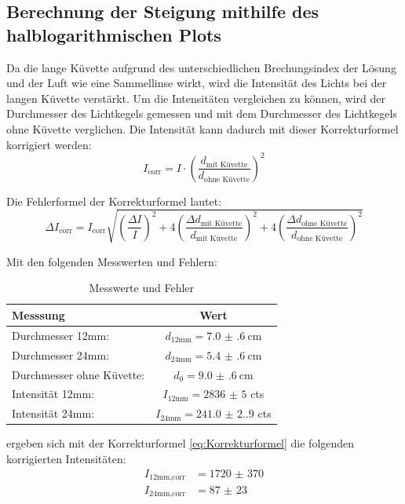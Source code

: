 \documentclass[12pt,a4paper,titlepage]{scrartcl}
\numberwithin{equation}{section}
\numberwithin{table}{section}
\numberwithin{figure}{section}
\begin{document}
\subsection{Berechnung der Steigung mithilfe des halblogarithmischen Plots}
Da die lange Küvette aufgrund des unterschiedlichen Brechungsindex der Lösung und der Luft wie eine Sammellinse wirkt, wird die Intensität des Lichts bei der langen Küvette verstärkt. Um die Intensitäten vergleichen zu können, wird der Durchmesser des Lichtkegels gemessen und mit dem Durchmesser des Lichtkegels ohne Küvette verglichen. Die Intensität kann dadurch mit dieser Korrekturformel korrigiert werden:
\begin{equation}
    I_\text{corr} = I \cdot \left(\frac{d_\text{mit Küvette}}{d_\text{ohne Küvette}}\right)^2\label{eq:Korrekturformel}
\end{equation}

Die Fehlerformel der Korrekturformel lautet:
\begin{equation}
    \Delta I_\text{corr} = I_\text{corr} \sqrt{\left(\frac{\Delta I}{I}\right)^2 + 4\left(\frac{\Delta d_\text{mit Küvette}}{d_\text{mit Küvette}}\right)^2 + 4\left(\frac{\Delta d_\text{ohne Küvette}}{d_\text{ohne Küvette}}\right)^2}
\end{equation}

Mit den folgenden Messwerten und Fehlern:
\begin{table}[H]
    \centering
    \caption{Messwerte und Fehler}
    \begin{tabular}{lc}
        \toprule
        Messsung & Wert\\
        \midrule
        Durchmesser 12mm: & $d_\text{12mm} = \qty{7.0(6)}{\centi\meter}$\\
        Durchmesser 24mm: & $d_\text{24mm} = \qty{5.4(6)}{\centi\meter}$\\
        Durchmesser ohne Küvette: & $d_0 = \qty{9.0(6)}{\centi\meter}$\\
        Intensität 12mm: & $I_\text{12mm} = \num{2836(5)}$ cts\\
        Intensität 24mm: & $I_\text{24mm} = \num{241.0(2.9)}$ cts\\
        \bottomrule
    \end{tabular}
\end{table}

ergeben sich mit der Korrekturformel \ref{eq:Korrekturformel} die folgenden korrigierten Intensitäten:
\begin{align}
    I_\text{12mm,corr} &= \num{1720(370)}\\
    I_\text{24mm,corr} &= \num{87(23)}
\end{align}
\end{document}
